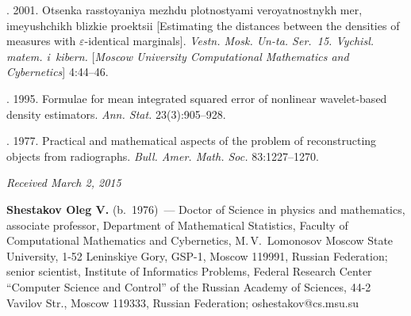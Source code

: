 \begin{multicols}{2}
{{\begin{thebibliography}{99}
.
2001. Otsenka rasstoyaniya mezhdu plotnostyami veroyatnostnykh mer,
imeyushchikh blizkie proektsii [Estimating the distances between
the densities of measures with $\varepsilon$-identical marginals].
\textit{Vestn. Mosk. Un-ta. Ser.~15. Vychisl. matem. i~kibern.}
[\textit{Moscow University Computational Mathematics and Cybernetics}] 4:44--46.

. 1995. Formulae for
mean integrated squared error of nonlinear wavelet-based density estimators.
\textit{Ann. Stat.} 23(3):905--928.

.
1977. Practical and mathematical aspects of the problem of reconstructing
objects from radiographs. \textit{Bull. Amer. Math. Soc.} 83:1227--1270.

\end{thebibliography}

 }
 }

\end{multicols}

\vspace*{-3pt}

\hfill{\small\textit{Received March 2, 2015}}



\Contrl

\noindent
\textbf{Shestakov Oleg V.} (b.\ 1976)~---
Doctor of Science in physics and mathematics, associate professor,
Department of Mathematical Statistics, Faculty of Computational Mathematics
and Cybernetics, M.\,V.~Lomonosov Moscow State University,
1-52 Leninskiye Gory, GSP-1, Moscow 119991, Russian Federation;
senior scientist, Institute of Informatics Problems, Federal Research
Center ``Computer Science and Control'' of the
Russian Academy of Sciences, 44-2 Vavilov Str., Moscow 119333,
Russian Federation; oshestakov@cs.msu.su


\label{end\stat}


\renewcommand{\bibname}{\protect\rm Литература}